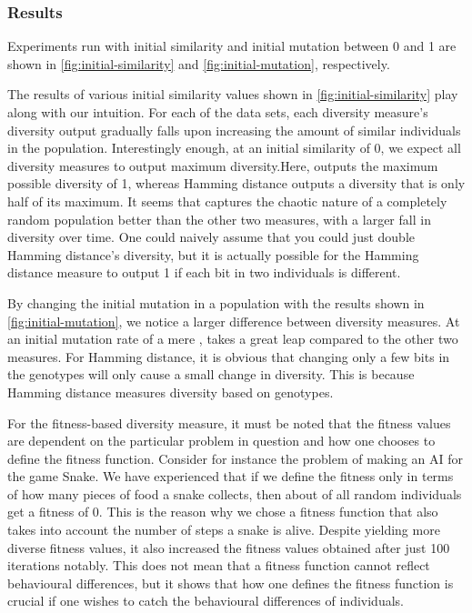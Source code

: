 \subsubsection{Results}
Experiments run with initial similarity and initial mutation between 0 and 1 are shown in \cref{fig:initial-similarity} and \cref{fig:initial-mutation}, respectively.
%

%
The results of various initial similarity values shown in \cref{fig:initial-similarity} play along with our intuition. For each of the data sets, each diversity measure's diversity output gradually falls upon increasing the amount of similar individuals in the population. Interestingly enough, at an initial similarity of 0, we expect all diversity measures to output maximum diversity.Here, \dia{} outputs the maximum possible diversity of 1, whereas Hamming distance outputs a diversity that is only half of its maximum. It seems that \dia{} captures the chaotic nature of a completely random population better than the other two measures, with a larger fall in diversity over time. One could naively assume that you could just double Hamming distance's diversity, but it is actually possible for the Hamming distance measure to output 1 if each bit in two individuals is different.



By changing the initial mutation in a population with the results shown in \cref{fig:initial-mutation}, we notice a larger difference between diversity measures. At an initial mutation rate of a mere , \dia{} takes a great leap compared to the other two measures. For Hamming distance, it is obvious that changing only a few bits in the genotypes will only cause a small change in diversity. This is because Hamming distance measures diversity based on genotypes.

For the fitness-based diversity measure, it must be noted that the fitness values are dependent on the particular problem in question and how one chooses to define the fitness function. Consider for instance the problem of making an AI for the game Snake. We have experienced that if we define the fitness only in terms of how many pieces of food a snake collects, then about  of all random individuals get a fitness of 0. This is the reason why we chose a fitness function that also takes into account the number of steps a snake is alive. Despite yielding more diverse fitness values, it also increased the fitness values obtained after just 100 iterations notably. This does not mean that a fitness function cannot reflect behavioural differences, but it shows that how one defines the fitness function is crucial if one wishes to catch the behavioural differences of individuals.
